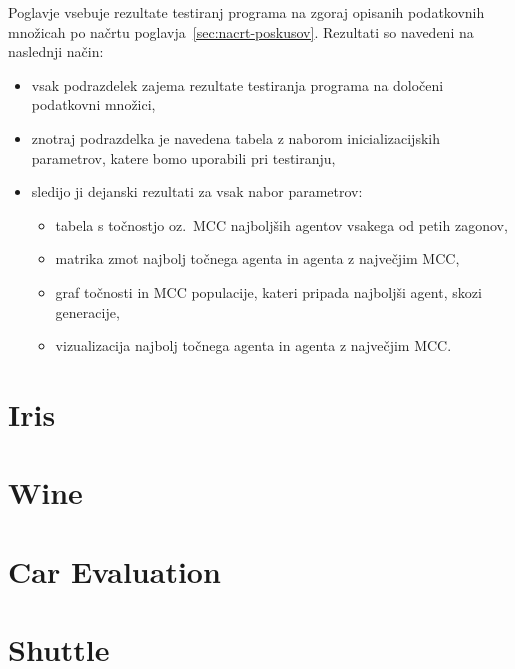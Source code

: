 Poglavje vsebuje rezultate testiranj programa na zgoraj opisanih podatkovnih množicah po načrtu poglavja~\ref{sec:nacrt-poskusov}.
Rezultati so navedeni na naslednji način:
\begin{itemize}
    \item vsak podrazdelek zajema rezultate testiranja programa na določeni podatkovni množici,
    \item znotraj podrazdelka je navedena tabela z naborom inicializacijskih parametrov, katere bomo uporabili pri testiranju,
    \item sledijo ji dejanski rezultati za vsak nabor parametrov:
    \begin{itemize}
        \item tabela s točnostjo oz.\ MCC najboljših agentov vsakega od petih zagonov,
        \item matrika zmot najbolj točnega agenta in agenta z največjim MCC,
        \item graf točnosti in MCC populacije, kateri pripada najboljši agent, skozi generacije,
        \item vizualizacija najbolj točnega agenta in agenta z največjim MCC.
    \end{itemize}
\end{itemize}

\section{Iris}\label{sec:dodatek-iris-test}


\section{Wine}\label{sec:dodatek-wine-test}


\section{Car Evaluation}\label{sec:dodatek-car-test}


\section{Shuttle}\label{sec:dodatek-statlog-test}


